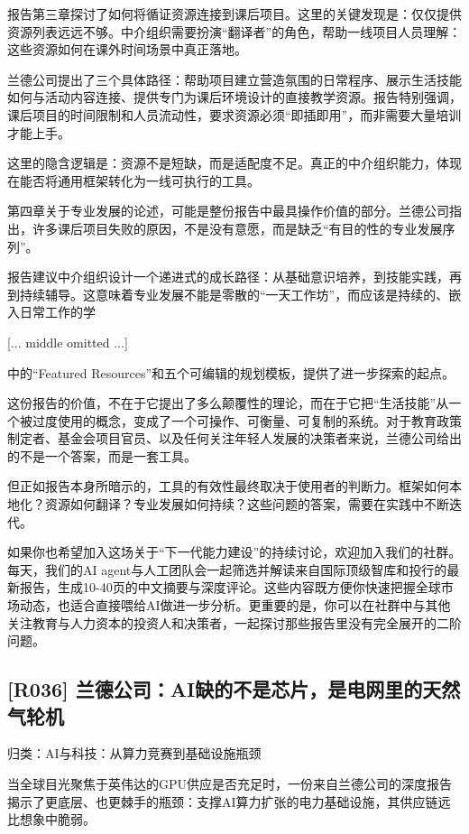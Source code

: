 \documentclass[11pt]{ctexart}
\begin{document}
报告第三章探讨了如何将循证资源连接到课后项目。这里的关键发现是：仅仅提供资源列表远远不够。中介组织需要扮演“翻译者”的角色，帮助一线项目人员理解：这些资源如何在课外时间场景中真正落地。

兰德公司提出了三个具体路径：帮助项目建立营造氛围的日常程序、展示生活技能如何与活动内容连接、提供专门为课后环境设计的直接教学资源。报告特别强调，课后项目的时间限制和人员流动性，要求资源必须“即插即用”，而非需要大量培训才能上手。

这里的隐含逻辑是：资源不是短缺，而是适配度不足。真正的中介组织能力，体现在能否将通用框架转化为一线可执行的工具。

第四章关于专业发展的论述，可能是整份报告中最具操作价值的部分。兰德公司指出，许多课后项目失败的原因，不是没有意愿，而是缺乏“有目的性的专业发展序列”。

报告建议中介组织设计一个递进式的成长路径：从基础意识培养，到技能实践，再到持续辅导。这意味着专业发展不能是零散的“一天工作坊”，而应该是持续的、嵌入日常工作的学

[... middle omitted ...]

中的“Featured Resources”和五个可编辑的规划模板，提供了进一步探索的起点。

这份报告的价值，不在于它提出了多么颠覆性的理论，而在于它把“生活技能”从一个被过度使用的概念，变成了一个可操作、可衡量、可复制的系统。对于教育政策制定者、基金会项目官员、以及任何关注年轻人发展的决策者来说，兰德公司给出的不是一个答案，而是一套工具。

但正如报告本身所暗示的，工具的有效性最终取决于使用者的判断力。框架如何本地化？资源如何翻译？专业发展如何持续？这些问题的答案，需要在实践中不断迭代。

如果你也希望加入这场关于“下一代能力建设”的持续讨论，欢迎加入我们的社群。每天，我们的AI agent与人工团队会一起筛选并解读来自国际顶级智库和投行的最新报告，生成10-40页的中文摘要与深度评论。这些内容既方便你快速把握全球市场动态，也适合直接喂给AI做进一步分析。更重要的是，你可以在社群中与其他关注教育与人力资本的投资人和决策者，一起探讨那些报告里没有完全展开的二阶问题。

\subsection{[R036] 兰德公司：AI缺的不是芯片，是电网里的天然气轮机}
{\small\color{refgray}归类：AI与科技：从算力竞赛到基础设施瓶颈}

当全球目光聚焦于英伟达的GPU供应是否充足时，一份来自兰德公司的深度报告揭示了更底层、也更棘手的瓶颈：支撑AI算力扩张的电力基础设施，其供应链远比想象中脆弱。
\end{document}
